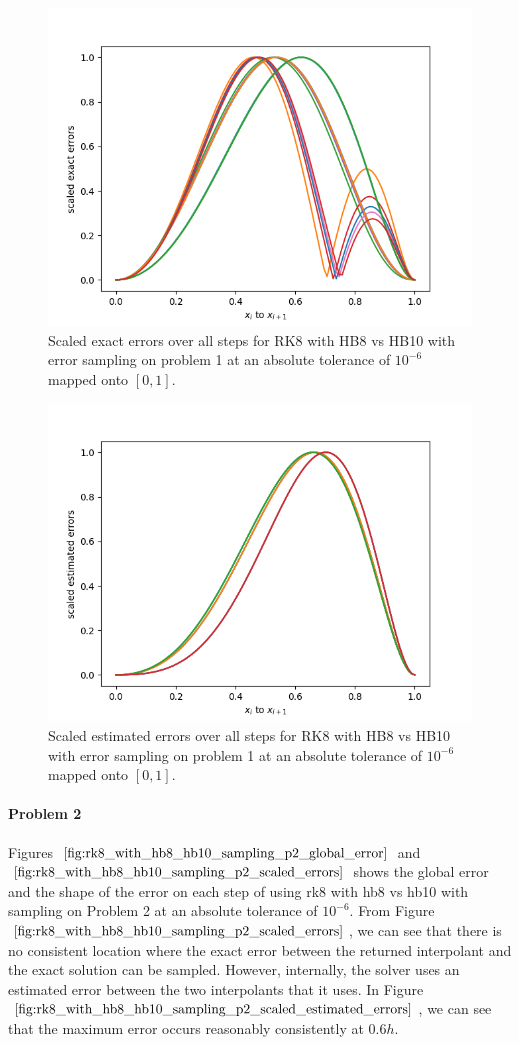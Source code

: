 \begin{figure}[H]
\centering
\includegraphics[width=0.7\linewidth]{./figures/rk8_with_hb8_hb10_sampling_p1_scaled_errors}
\caption{Scaled exact errors over all steps for RK8 with HB8 vs HB10 with error sampling on problem 1 at an absolute tolerance of $10^{-6}$ mapped onto $[0, 1]$.}
\label{fig:rk8_with_hb8_hb10_sampling_p1_scaled_errors}
\end{figure}

\begin{figure}[H]
\centering
\includegraphics[width=0.7\linewidth]{./figures/rk8_with_hb8_hb10_sampling_p1_scaled_estimated_errors}
\caption{Scaled estimated errors over all steps for RK8 with HB8 vs HB10 with error sampling on problem 1 at an absolute tolerance of $10^{-6}$ mapped onto $[0, 1]$.}
\label{fig:rk8_with_hb8_hb10_sampling_p1_scaled_estimated_errors}
\end{figure}


\paragraph{Problem 2} Figures $\ref{fig:rk8_with_hb8_hb10_sampling_p2_global_error}$ and $\ref{fig:rk8_with_hb8_hb10_sampling_p2_scaled_errors}$ shows the global error and the shape of the error on each step of using rk8 with hb8 vs hb10 with sampling on Problem 2 at an absolute tolerance of $10^{-6}$. From Figure $\ref{fig:rk8_with_hb8_hb10_sampling_p2_scaled_errors}$, we can see that there is no consistent location where the exact error between the returned interpolant and the exact solution can be sampled. However, internally, the solver uses an estimated error between the two interpolants that it uses. In Figure $\ref{fig:rk8_with_hb8_hb10_sampling_p2_scaled_estimated_errors}$, we can see that the maximum error occurs reasonably consistently at $0.6h$.

